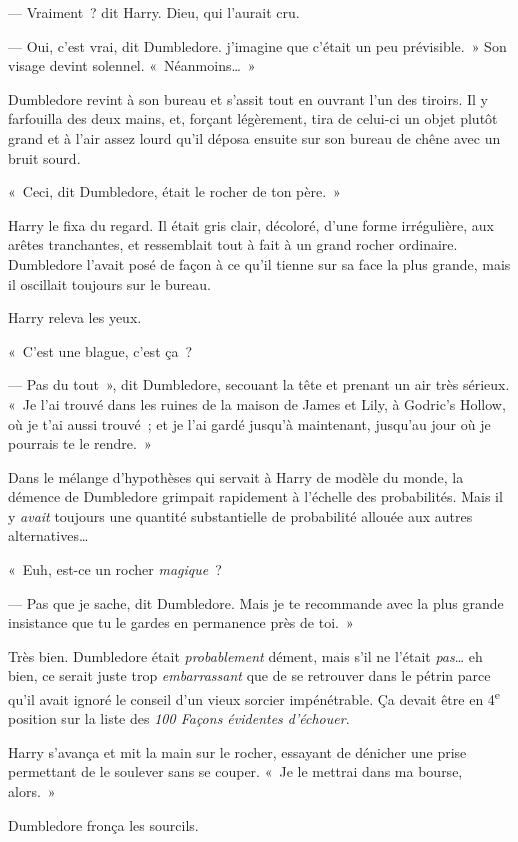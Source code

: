 --- Vraiment~? dit Harry.
Dieu, qui l'aurait cru.

--- Oui, c'est vrai, dit Dumbledore. j'imagine que c'était un peu prévisible.~»
Son visage devint solennel.
«~Néanmoins…~»

Dumbledore revint à son bureau et s'assit tout en ouvrant l'un des tiroirs.
Il y farfouilla des deux mains, et, forçant légèrement, tira de celui-ci un objet plutôt grand et à l'air assez lourd qu'il déposa ensuite sur son bureau de chêne avec un bruit sourd.

«~Ceci, dit Dumbledore, était le rocher de ton père.~»

Harry le fixa du regard.
Il était gris clair, décoloré, d'une forme irrégulière, aux arêtes tranchantes, et ressemblait tout à fait à un grand rocher ordinaire.
Dumbledore l'avait posé de façon à ce qu'il tienne sur sa face la plus grande, mais il oscillait toujours sur le bureau.

Harry releva les yeux.

«~C'est une blague, c'est ça~?

--- Pas du tout~», dit Dumbledore, secouant la tête et prenant un air très sérieux.
«~Je l'ai trouvé dans les ruines de la maison de James et Lily, à Godric's Hollow, où je t'ai aussi trouvé~; et je l'ai gardé jusqu'à maintenant, jusqu'au jour où je pourrais te le rendre.~»

Dans le mélange d'hypothèses qui servait à Harry de modèle du monde, la démence de Dumbledore grimpait rapidement à l'échelle des probabilités.
Mais il y \emph{avait} toujours une quantité substantielle de probabilité allouée aux autres alternatives…

«~Euh, est-ce un rocher \emph{magique}~?

--- Pas que je sache, dit Dumbledore.
Mais je te recommande avec la plus grande insistance que tu le gardes en permanence près de toi.~»

Très bien.
Dumbledore était \emph{probablement} dément, mais s'il ne l'était \emph{pas}… eh bien, ce serait juste trop \emph{embarrassant} que de se retrouver dans le pétrin parce qu'il avait ignoré le conseil d'un vieux sorcier impénétrable.
Ça devait être en 4\textsuperscript{e} position sur la liste des \emph{100 Façons évidentes d'échouer}.

Harry s'avança et mit la main sur le rocher, essayant de dénicher une prise permettant de le soulever sans se couper.
«~Je le mettrai dans ma bourse, alors.~»

Dumbledore fronça les sourcils.

